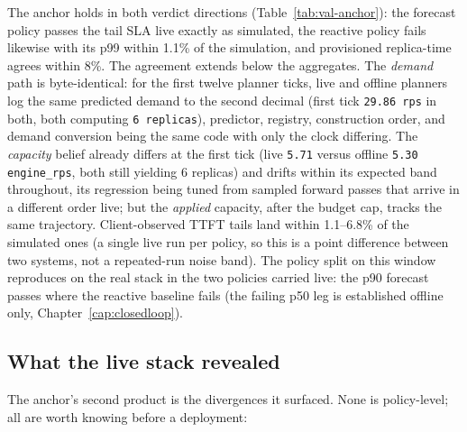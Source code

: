The anchor holds in both verdict directions (Table~\ref{tab:val-anchor}):
the forecast policy passes the tail SLA live exactly as simulated, the
reactive policy fails likewise with its p99 within 1.1\% of the simulation,
and provisioned replica-time agrees within 8\%. The agreement extends below
the aggregates. The \emph{demand} path is byte-identical: for the first
twelve planner ticks, live and offline planners log the same predicted demand
to the second decimal (first tick \texttt{29.86 rps} in both, both computing
\texttt{6 replicas}), predictor, registry, construction order, and demand
conversion being the same code with only the clock differing. The
\emph{capacity} belief already differs at the first tick (live \texttt{5.71}
versus offline \texttt{5.30 engine\_rps}, both still yielding 6 replicas)
and drifts within its expected band throughout, its regression being tuned
from sampled forward passes that arrive in a different order live; but the
\emph{applied} capacity, after the budget cap, tracks the same trajectory.
Client-observed TTFT tails land within 1.1--6.8\% of the simulated ones (a
single live run per policy, so this is a point difference between two
systems, not a repeated-run noise band). The policy split on this window
reproduces on the real stack in the two policies carried live: the p90 forecast passes
where the reactive baseline fails (the failing p50 leg is established
offline only, Chapter~\ref{cap:closedloop}).

\subsection{What the live stack revealed}
\label{sec:val-findings}

The anchor's second product is the divergences it surfaced. None is
policy-level; all are worth knowing before a deployment:


